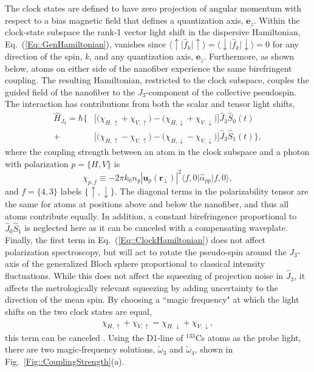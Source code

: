 \documentclass[preprint, aps,pra,onecolumn]{revtex4-1} %
\def\bra#1{\langle{#1}\rvert}%
\def\ket#1{\lvert{#1}\rangle}%
\newcommand{\erf}[1]{Eq.~(\ref{#1})}
\newcommand{\frf}[1]{Fig.~\ref{#1}}
\newcommand{\mbf}[1]{\mathbf{#1}}
\newcommand{\jz}{\hat{J}_3}
\newcommand{\magic}[1]{\tilde{\omega}_{#1}}
\begin{document}
The clock states are defined to have zero projection of angular momentum with respect to a bias magnetic field that defines a quantization axis, $\mathbf{e}_{\tilde{z}}$.  
Within the clock-state subspace the rank-1 vector light shift in the dispersive Hamiltonian, \erf{Eq::GenHamiltonian}, vanishes since $\bra{\uparrow}\hat{f}_k \ket{\uparrow} =\bra{\downarrow}\hat{f}_k \ket{\downarrow} = 0$ for any direction of the spin, $k$, and any quantization axis, $\mathbf{e}_{\tilde{z}}$. 
Furthermore, as shown below, atoms on either side of the nanofiber experience the same birefringent coupling. 
The resulting Hamiltonian, restricted to the clock subspace, couples the guided field of the nanofiber to the $J_3$-component of the collective pseudospin. The interaction has contributions from both the scalar and tensor light shifts,
	\begin{align} \label{Eq::ClockHamiltonian}
		\hat{H}_{J_3} = \hbar \Big\{ & \big[ \big( \chi_{H,\uparrow} +\chi_{V,\uparrow} \big) - \big( \chi_{H,\downarrow} + \chi_{V,\downarrow}\big) \big] \jz \hat{S}_0(t) \\
		+ & \big[  \big( \chi_{H, \uparrow} - \chi_{V,\uparrow} \big) - \big(\chi_{H,\downarrow} - \chi_{V,\downarrow} \big) \big]  \jz \hat{S}_1(t) \Big\}, \nonumber
	\end{align}
where the coupling strength between an atom in the clock subspace and a photon with polarization $p = \{H,V\}$ is
	\begin{equation} \label{Eq::ClockCouplingStrength}
		\chi_{p,f} \equiv - 2\pi k_0 n_g  | \mathbf{u}_p(\mbf{r}_\perp)|^2 \bra{f,0}\hat{\alpha}_{pp}  \ket{f,0},
	\end{equation}
and $f = \{4,3\}$ labels $\{\uparrow,\downarrow\}$.  
The diagonal terms in the polarizability tensor are the same for atoms at positions above and below the nanofiber, and thus all atoms contribute equally. 
In addition, a constant birefringence proportional to $ \hat{J}_0\hat{S}_1 $ is neglected here as it can be canceled with a compensating waveplate. 
Finally, the first term in \erf{Eq::ClockHamiltonian} does not affect polarization spectroscopy, but will act to rotate the pseudo-spin around the $J_3$-axis of the generalized Bloch sphere proportional to classical intensity fluctuations.
While this does not affect the squeezing of projection noise in $\hat{J}_3$, it affects the metrologically relevant squeezing by adding uncertainty to the direction of the mean spin.  By choosing a ``magic frequency" at which the light shifts on the two clock states are equal, 
	\begin{align} \label{Eq::MagicWavelengthCondition}
		\chi_{H,\uparrow} +\chi_{V,\uparrow}  = \chi_{H,\downarrow} + \chi_{V,\downarrow},
	\end{align}
this term can be canceled \cite{chaudhury_continuous_2006}.
Using the D1-line of $^{133}$Cs atoms as the probe light, there are two magic-frequency solutions, $ \magic{3} $ and $\magic{4}$, shown in \frf{Fig::CouplingStrength}(a).  
\end{document}
